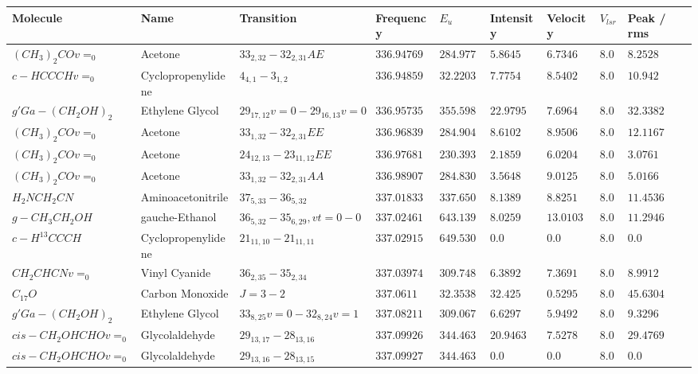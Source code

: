 \documentclass[10pt]{article}
\begin{document}
\begin{table}[htb]
\small
    \centering    
    \begin{tabular}{l l l l l l l l l} 
\hline
Molecule & Name & Transition & Frequency & $E_{{u}}$ & Intensity & Velocity & $V_{{lsr}}$ & Peak / rms \\
\hline
$(CH_{3})_{2}COv=_{0}$ & Acetone & $33_{2,32}-32_{2,31}AE$ & $336.94769$ & $284.9779$ & $5.8645$ & $6.7346$ & $8.0$ & $8.2528$\\
$c-HCCCHv=_{0}$ & Cyclopropenylidene & $4_{4,1}-3_{1,2}$ & $336.94859$ & $32.2203$ & $7.7754$ & $8.5402$ & $8.0$ & $10.942$\\
$g'Ga-(CH_{2}OH)_{2}$ & Ethylene Glycol & $29_{17,12}v=0-29_{16,13}v=0$ & $336.95735$ & $355.5986$ & $22.9795$ & $7.6964$ & $8.0$ & $32.3382$\\
$(CH_{3})_{2}COv=_{0}$ & Acetone & $33_{1,32}-32_{2,31}EE$ & $336.96839$ & $284.9042$ & $8.6102$ & $8.9506$ & $8.0$ & $12.1167$\\
$(CH_{3})_{2}COv=_{0}$ & Acetone & $24_{12,13}-23_{11,12}EE$ & $336.97681$ & $230.3935$ & $2.1859$ & $6.0204$ & $8.0$ & $3.0761$\\
$(CH_{3})_{2}COv=_{0}$ & Acetone & $33_{1,32}-32_{2,31}AA$ & $336.98907$ & $284.8304$ & $3.5648$ & $9.0125$ & $8.0$ & $5.0166$\\
$H_{2}NCH_{2}CN$ & Aminoacetonitrile & $37_{5,33}-36_{5,32}$ & $337.01833$ & $337.6508$ & $8.1389$ & $8.8251$ & $8.0$ & $11.4536$\\
$g-CH_{3}CH_{2}OH$ & gauche-Ethanol & $36_{5,32}-35_{6,29},vt=0-0$ & $337.02461$ & $643.1397$ & $8.0259$ & $13.0103$ & $8.0$ & $11.2946$\\
$c-H^{13}CCCH$ & Cyclopropenylidene & $21_{11,10}-21_{11,11}$ & $337.02915$ & $649.5308$ & $0.0$ & $0.0$ & $8.0$ & $0.0$\\
$CH_{2}CHCNv=_{0}$ & Vinyl Cyanide & $36_{2,35}-35_{2,34}$ & $337.03974$ & $309.7482$ & $6.3892$ & $7.3691$ & $8.0$ & $8.9912$\\
$C_{17}O$ & Carbon Monoxide & $J=3-2$ & $337.0611$ & $32.3538$ & $32.425$ & $0.5295$ & $8.0$ & $45.6304$\\
$g'Ga-(CH_{2}OH)_{2}$ & Ethylene Glycol & $33_{8,25}v=0-32_{8,24}v=1$ & $337.08211$ & $309.0677$ & $6.6297$ & $5.9492$ & $8.0$ & $9.3296$\\
$cis-CH_{2}OHCHOv=_{0}$ & Glycolaldehyde & $29_{13,17}-28_{13,16}$ & $337.09926$ & $344.463$ & $20.9463$ & $7.5278$ & $8.0$ & $29.4769$\\
$cis-CH_{2}OHCHOv=_{0}$ & Glycolaldehyde & $29_{13,16}-28_{13,15}$ & $337.09927$ & $344.463$ & $0.0$ & $0.0$ & $8.0$ & $0.0$\\

\end{tabular}
\end{table}
\end{document}
